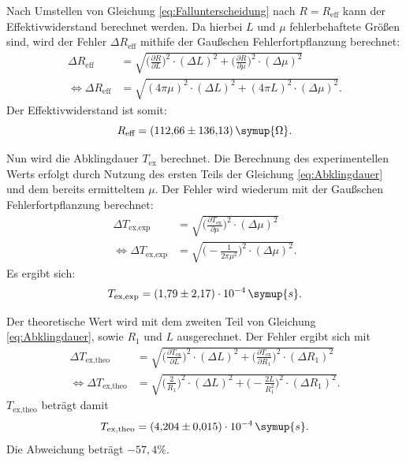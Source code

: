 Nach Umstellen von Gleichung \eqref{eq:Fallunterscheidung} nach $R=R_{\text{eff}}$ kann der Effektivwiderstand berechnet werden. Da hierbei $L$ und $\mu$ fehlerbehaftete Größen sind, wird der Fehler
$\Delta R_{\text{eff}}$ mithife der Gaußschen Fehlerfortpflanzung berechnet:
\begin{equation*}
\begin{aligned}
\Delta R_{\text{eff}} &= \sqrt{\biggl(\frac{\partial R}{\partial L}\biggr)^2 \cdot (\Delta L)^2 + \biggl(\frac{\partial R}{\partial \mu}\biggr)^2 \cdot (\Delta \mu)^2} \\
\iff \Delta R_{\text{eff}} &= \sqrt{(4\pi \mu)^2 \cdot (\Delta L)^2 + (4\pi L)^2 \cdot (\Delta \mu)^2}.
\end{aligned}
\end{equation*}
Der Effektivwiderstand ist somit:
\begin{equation*}
R_{\text{eff}} = (112{,}66 \pm 136{,}13)\,\symup{\Omega}.
\end{equation*}

Nun wird die Abklingdauer $T_{\text{ex}}$ berechnet. Die Berechnung des experimentellen Werts erfolgt durch Nutzung des ersten Teils der Gleichung \eqref{eq:Abklingdauer} und dem bereits ermitteltem $\mu$. 
Der Fehler wird wiederum mit der Gaußschen Fehlerfortpflanzung berechnet:
\begin{equation*}
\begin{aligned}
\Delta T_{\text{ex,exp}} &= \sqrt{\biggl(\frac{\partial T_{\text{ex}}}{\partial \mu}\biggr)^2 \cdot (\Delta \mu )^2} \\
\iff \Delta T_{\text{ex,exp}} &= \sqrt{\biggl(-\frac{1}{2\pi \mu^2}\biggr)^2 \cdot (\Delta \mu )^2}.
\end{aligned}
\end{equation*}
Es ergibt sich:
\begin{equation*}
T_{\text{ex,exp}} = (1{,}79 \pm 2{,}17)\cdot 10^{-4}\, \symup{s}.
\end{equation*}

Der theoretische Wert wird mit dem zweiten Teil von Gleichung \eqref{eq:Abklingdauer}, sowie $R_1$ und $L$ ausgerechnet. Der Fehler ergibt sich mit
\begin{equation*}
\begin{aligned}
\Delta T_{\text{ex,theo}} &= \sqrt{\biggl(\frac{\partial T_{\text{ex}}}{\partial L}\biggr)^2 \cdot (\Delta L )^2 + \biggl(\frac{\partial T_{\text{ex}}}{\partial R_1}\biggr)^2 \cdot (\Delta R_1 )^2} \\
\iff \Delta T_{\text{ex,theo}} &= \sqrt{\biggl(\frac{2}{R_1}\biggr)^2 \cdot (\Delta L )^2 + \biggl(-\frac{2L}{R_1^2}\biggr)^2 \cdot (\Delta R_1 )^2}.
\end{aligned}
\end{equation*}
$T_{\text{ex,theo}}$ beträgt damit
\begin{equation*}
T_{\text{ex,theo}} = (4{,}204 \pm 0{,}015)\cdot 10^{-4}\, \symup{s}.
\end{equation*}
Die Abweichung beträgt $-57{,}4\%$.

